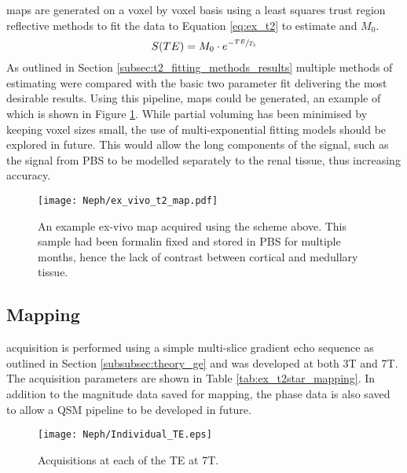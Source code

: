 \ttwo maps are generated on a voxel by voxel basis using a least squares trust region reflective methods to fit the data to Equation \eqref{eq:ex_t2} to estimate \ttwo and $M_0$. 
\begin{equation}
	S(TE) = M_0 \cdot e^{-\sfrac{TE}{T_2}}
	\label{eq:ex_t2}
\end{equation}
As outlined in Section \ref{subsec:t2_fitting_methods_results} multiple methods of estimating \ttwo were compared with the basic two parameter fit delivering the most desirable results. Using this pipeline, \ttwo maps could be generated, an example of which is shown in Figure \ref{fig:ex_t2_map}. While partial voluming has been minimised by keeping voxel sizes small, the use of multi-exponential fitting models should be explored in future. This would allow the long \ttwo components of the signal, such as the signal from \ac{PBS} to be modelled separately to the renal tissue, thus increasing accuracy.

\begin{figure}[H]
	\centering
	\texttt{[image: Neph/ex\_vivo\_t2\_map.pdf]}
	\caption{An example ex-vivo \ttwo map acquired using the scheme above. This sample had been formalin fixed and stored in \ac{PBS} for multiple months, hence the lack of contrast between cortical and medullary tissue.}
	\label{fig:ex_t2_map}
\end{figure}

\subsection{\ttwostar Mapping}

\ttwostar acquisition is performed using a simple multi-slice gradient echo sequence as outlined in Section \ref{subsubsec:theory_ge} and was developed at both 3T and 7T. The acquisition parameters are shown in Table \ref{tab:ex_t2star_mapping}. In addition to the magnitude data saved for \ttwostar mapping, the phase data is also saved to allow a \ac{QSM} pipeline to be developed in future.

\begin{figure}[H]
	\centering
	\texttt{[image: Neph/Individual\_TE.eps]}
	\caption{Acquisitions at each of the \ac{TE} at 7T.}
	\label{fig:ex_t2star_raw_data}	
\end{figure}

